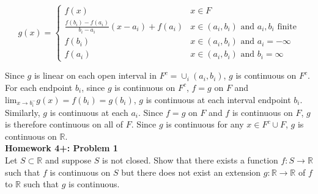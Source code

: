 \documentclass[a4paper]{article}
\begin{document}
$$
g(x) = \begin{cases} f(x) & x \in F\\
 \frac{f(b_i) - f(a_i)}{b_i-a_i}(x-a_i) + f(a_i) & x \in (a_i,b_i) \text{ and } a_i,b_i \text{ finite}\\
 f(b_i) & x \in (a_i,b_i) \text{ and } a_i= - \infty\\
 f(a_i) & x \in (a_i,b_i) \text{ and } b_i = \infty
 \end{cases}
$$

Since $g$ is linear on each open interval in $F^c = \cup_i (a_i,b_i)$, $g$ is continuous on $F^c$. For each endpoint $b_i$, since $g$ is continuous on $F^c$, $f=g$ on $F$ and $\text{lim}_{x\rightarrow b_i^-} g(x) = f(b_i) = g(b_i)$, $g$ is continuous at each interval endpoint $b_i$. Similarly, $g$ is continuous at each $a_i$. Since $f=g$ on $F$ and $f$ is continuous on $F$, $g$ is therefore continuous on all of $F$. Since $g$ is continuous for any $x \in F^c\cup F$, $g$ is continuous on $\mathbb{R}$.  \\


{\bf Homework 4+: Problem 1}\\

Let $S\subset \mathbb{R}$ and suppose $S$ is not closed. Show that there exists a function $f:S\rightarrow \mathbb{R}$ such that $f$ is continuous on $S$ but there does not exist an extension $g:\mathbb{R}\rightarrow \mathbb{R}$ of $f$ to $\mathbb{R}$ such that $g$ is continuous.\\
\end{document}
